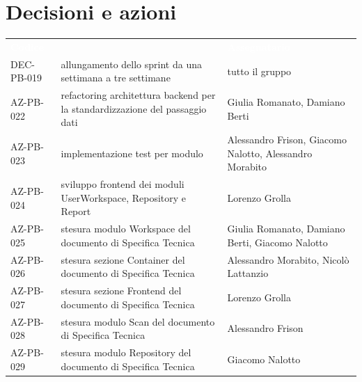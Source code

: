 \documentclass[a4paper, 11pt]{article}
\begin{document}
\section{Decisioni e azioni} \label{DecisioniAzioni}
\begin{center}
    \begin{tabular}{>{\centering\arraybackslash}m{3cm} >{\raggedright\arraybackslash}p{6cm} >{\centering\arraybackslash}p{3.5cm}}
        \rowcolor{AccentColor}
        \textcolor{white}{\textbf{Codice }} & 
        \multicolumn{1}{c}{\textcolor{white}{\textbf{Descrizione}}} & 
        \textcolor{white}{\textbf{Assegnatario}} \\
        DEC-PB-019 & allungamento dello sprint da una settimana a tre settimane & tutto il gruppo \\ 
        \midrule
        AZ-PB-022 & refactoring architettura backend per la standardizzazione del passaggio dati & Giulia Romanato, Damiano Berti \\
        AZ-PB-023 & implementazione test per modulo & Alessandro Frison, Giacomo Nalotto, Alessandro Morabito\\
        AZ-PB-024 & sviluppo frontend dei moduli UserWorkspace, Repository e Report & Lorenzo Grolla \\
        AZ-PB-025 & stesura modulo Workspace del documento di Specifica Tecnica & Giulia Romanato, Damiano Berti, Giacomo Nalotto \\
        AZ-PB-026 & stesura sezione Container del documento di Specifica Tecnica & Alessandro Morabito, Nicolò Lattanzio \\
        AZ-PB-027 & stesura sezione Frontend del documento di Specifica Tecnica & Lorenzo Grolla \\
        AZ-PB-028 & stesura modulo Scan del documento di Specifica Tecnica & Alessandro Frison \\
        AZ-PB-029 & stesura modulo Repository del documento di Specifica Tecnica & Giacomo Nalotto \\
    \end{tabular}
\end{center}
\end{document}
